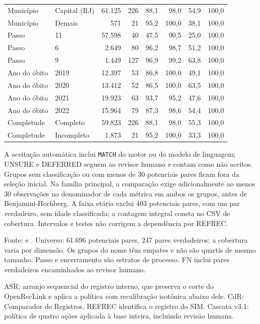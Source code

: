 \begin{table}[htbp]
{\begin{tabular}{llrrrrrr}
Munic\'ipio & Capital (RJ) & 61.125 & 226 & 88{,}1 & 98{,}0 & 54{,}9 & 100{,}0 \\
Munic\'ipio & Demais & 571 & 21 & 95{,}2 & 100{,}0 & 38{,}1 & 100{,}0 \\
\midrule
Passo & 11 & 57.598 & 40 & 47{,}5 & 90{,}5 & 25{,}0 & 100{,}0 \\
Passo & 6 & 2.649 & 80 & 96{,}2 & 98{,}7 & 51{,}2 & 100{,}0 \\
Passo & 9 & 1.449 & 127 & 96{,}9 & 99{,}2 & 63{,}8 & 100{,}0 \\
\midrule
Ano do \'obito & 2019 & 12.397 & 53 & 86{,}8 & 100{,}0 & 49{,}1 & 100{,}0 \\
Ano do \'obito & 2020 & 13.412 & 52 & 86{,}5 & 100{,}0 & 63{,}5 & 100{,}0 \\
Ano do \'obito & 2021 & 19.923 & 63 & 93{,}7 & 95{,}2 & 47{,}6 & 100{,}0 \\
Ano do \'obito & 2022 & 15.964 & 79 & 87{,}3 & 98{,}6 & 54{,}4 & 100{,}0 \\
\midrule
Completude & Completo & 59.823 & 226 & 88{,}1 & 98{,}0 & 55{,}3 & 100{,}0 \\
Completude & Incompleto & 1.873 & 21 & 95{,}2 & 100{,}0 & 33{,}3 & 100{,}0 \\
\bottomrule
\end{tabular}}
\par\smallskip\begin{minipage}{\linewidth}\footnotesize A aceitação automática inclui \texttt{MATCH} do motor ou do modelo de linguagem; UNSURE e DEFERRED seguem ao revisor humano e contam como não aceitos. Grupos sem classificação ou com menos de 30 potenciais pares ficam fora da seleção inicial. Na família principal, a comparação exige adicionalmente ao menos 30 observações no denominador de cada métrica em ambos os grupos, antes de Benjamini-Hochberg. A faixa etária exclui 403 potenciais pares, com um par verdadeiro, sem idade classificada; a contagem integral consta no CSV de cobertura. Intervalos e testes não corrigem a dependência por REFREC.\end{minipage}\par\footnotesize Fonte:  e . Universo: 61.696 potenciais pares, 247 pares verdadeiros; a cobertura varia por dimensão. Os grupos do nome têm empates e não são quartis de mesmo tamanho. Passo e encerramento são estratos de processo. FN inclui pares verdadeiros encaminhados ao revisor humano.
\par\footnotesize ASR: arranjo sequencial do registro interno, que preserva o corte do OpenRecLink e aplica a política com recalibração isotônica abaixo dele. CdR: Comparador de Registros. REFREC identifica o registro do SIM. Cascata v3.1: política de quatro ações aplicada à base inteira, incluindo revisão humana.
\end{table}
